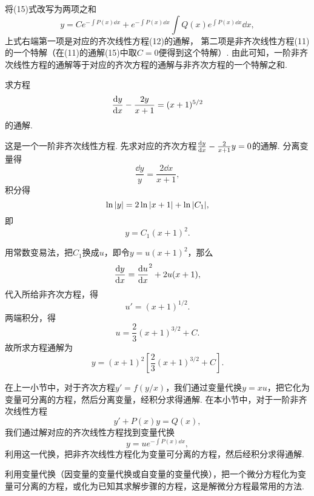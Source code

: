 将(15)式改写为两项之和\[
	y = C e^{ -\int P(x) \dd{x} }
	+ e^{ -\int P(x) \dd{x} } \int Q(x) e^{ \int P(x) \dd{x} } \dd{x},
\]
上式右端第一项是对应的齐次线性方程(12)的通解，
第二项是非齐次线性方程(11)的一个特解（在(11)的通解(15)中取\(C=0\)便得到这个特解）.
由此可知，一阶非齐次线性方程的通解等于对应的齐次方程的通解与非齐次方程的一个特解之和.

\begin{example}
求方程\[
	\dv{y}{x} - \frac{2y}{x+1} = (x+1)^{5/2}
\]的通解.
\begin{solution}
这是一个一阶非齐次线性方程.
先求对应的齐次方程\(\dv{y}{x} - \frac{2}{x+1} y = 0\)的通解.
分离变量得\[
	\frac{\dd{y}}{y} = \frac{2 \dd{x}}{x+1},
\]
积分得\[
	\ln\abs{y} = 2\ln\abs{x+1}+ \ln\abs{C_1},
\]
即\[
	y = C_1 (x+1)^2.
\]

用常数变易法，把\(C_1\)换成\(u\)，即令\(y = u(x+1)^2\)，那么\[
	\dv{y}{x} = \dv{u}{x} (x+1)^2 + 2u(x+1),
\]
代入所给非齐次方程，得\[
	u' = (x+1)^{1/2}.
\]
两端积分，得\[
	u = \frac{2}{3} (x+1)^{3/2} + C.
\]
故所求方程通解为\[
	y = (x+1)^2 \left[
	\frac{2}{3} (x+1)^{3/2} + C
	\right].
\]
\end{solution}
\end{example}

在上一小节中，对于齐次方程\(y' = f(y/x)\)，我们通过变量代换\(y = xu\)，把它化为变量可分离的方程，然后分离变量，经积分求得通解.
在本小节中，对于一阶非齐次线性方程\[
y' + P(x) y = Q(x),
\]我们通过解对应的齐次线性方程找到变量代换\[
y = u e^{- \int P(x) \dd{x}},
\]利用这一代换，把非齐次线性方程化为变量可分离的方程，然后经积分求得通解.

利用变量代换（因变量的变量代换或自变量的变量代换），把一个微分方程化为变量可分离的方程，或化为已知其求解步骤的方程，这是解微分方程最常用的方法.

